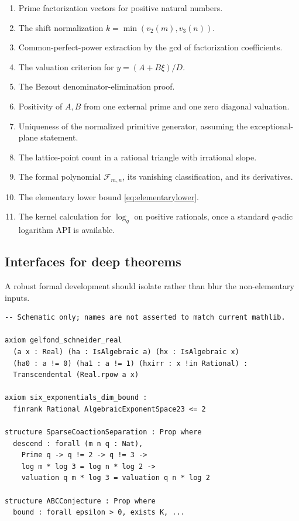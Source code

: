 \documentclass[11pt,oneside]{article}
\theoremstyle{definition}
\begin{document}
\begin{enumerate}
\item Prime factorization vectors for positive natural numbers.
\item The shift normalization $k=\min(v_2(m),v_3(n))$.
\item Common-perfect-power extraction by the gcd of factorization coefficients.
\item The valuation criterion for $y=(A+B\xi)/D$.
\item The Bezout denominator-elimination proof.
\item Positivity of $A,B$ from one external prime and one zero diagonal valuation.
\item Uniqueness of the normalized primitive generator, assuming the exceptional-plane statement.
\item The lattice-point count in a rational triangle with irrational slope.
\item The formal polynomial $\mathcal F_{m,n}$, its vanishing classification, and its derivatives.
\item The elementary lower bound \eqref{eq:elementarylower}.
\item The kernel calculation for $\log_q$ on positive rationals, once a standard $q$-adic logarithm API is available.
\end{enumerate}

\subsection{Interfaces for deep theorems}

A robust formal development should isolate rather than blur the non-elementary inputs.

\begin{lstlisting}
-- Schematic only; names are not asserted to match current mathlib.

axiom gelfond_schneider_real
  (a x : Real) (ha : IsAlgebraic a) (hx : IsAlgebraic x)
  (ha0 : a != 0) (ha1 : a != 1) (hxirr : x !in Rational) :
  Transcendental (Real.rpow a x)

axiom six_exponentials_dim_bound :
  finrank Rational AlgebraicExponentSpace23 <= 2

structure SparseCoactionSeparation : Prop where
  descend : forall (m n q : Nat),
    Prime q -> q != 2 -> q != 3 ->
    log m * log 3 = log n * log 2 ->
    valuation q m * log 3 = valuation q n * log 2

structure ABCConjecture : Prop where
  bound : forall epsilon > 0, exists K, ...
\end{lstlisting}
\end{document}
